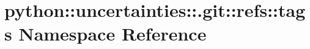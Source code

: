 \hypertarget{namespacepython_1_1uncertainties_1_1_8git_1_1refs_1_1tags}{
\section{python::uncertainties::.git::refs::tags Namespace Reference}
\label{namespacepython_1_1uncertainties_1_1_8git_1_1refs_1_1tags}
}

